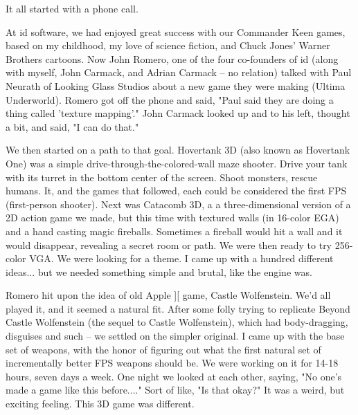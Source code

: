 It all started with a phone call.\\
\par
At id software, we had enjoyed great success with our Commander Keen games, based on my childhood, my love of science fiction, and Chuck Jones' Warner Brothers cartoons. Now John Romero, one of the four co-founders of id (along with myself, John Carmack, and Adrian Carmack -- no relation) talked with Paul Neurath of Looking Glass Studios about a new game they were making (Ultima Underworld).  Romero got off the phone and said, "Paul said they are doing a thing called 'texture mapping'." John Carmack looked up and to his left, thought a bit, and said, "I can do that."\\
\par
We then started on a path to that goal. Hovertank 3D (also known as Hovertank One) was a simple drive-through-the-colored-wall maze shooter. Drive your tank with its turret in the bottom center of the screen. Shoot monsters, rescue humans. It, and the games that followed, each could be considered the first FPS (first-person shooter). Next was Catacomb 3D, a a three-dimensional version of a 2D action game we made, but this time with textured walls (in 16-color EGA) and a hand casting magic fireballs.  Sometimes a fireball would hit a wall and it would disappear, revealing a secret room or path. We were then ready to try 256-color VGA.  We were looking for a theme. I came up with a hundred different ideas... but we needed something simple and brutal, like the engine was.\\
\par
Romero hit upon the idea of old Apple ][ game, Castle Wolfenstein. We'd all played it, and it seemed a natural fit. After some folly trying to replicate Beyond Castle Wolfenstein (the sequel to Castle Wolfenstein), which had body-dragging, disguises and such -- we settled on the simpler original. I came up with the base set of weapons, with the honor of figuring out what the first natural set of incrementally better FPS weapons should be. We were working on it for 14-18 hours, seven days a week. One night we looked at each other, saying, "No one's made a game like this before...." Sort of like, "Is that okay?" It was a weird, but exciting feeling. This 3D game was different.\\
\par
